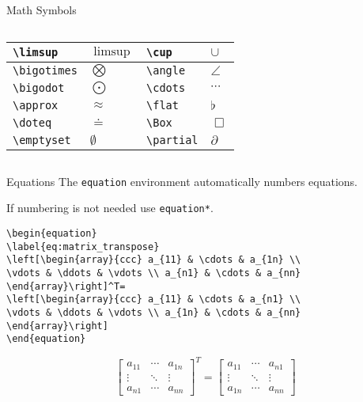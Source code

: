 \begin{frame}[fragile]{Math Symbols}
\begin{columns}
\begin{column}{5.5cm}
\begin{center}
\begin{tabular}{| l l | l l|}
\hline
\verb!\limsup! & $\limsup$ & \verb!\cup! & $\cup$
\\
\hline
\verb!\bigotimes! & $\bigotimes$ & \verb!\angle! & $\angle$
\\
\hline
\verb!\bigodot! & $\bigodot$ & \verb!\cdots! & $\cdots$
\\
\hline
\verb!\approx! & $\approx$ & \verb!\flat! & $\flat$
\\
\hline
\verb!\doteq! & $\doteq$ & \verb!\Box! & $\Box$
\\
\hline
\verb!\emptyset! & $\emptyset$ & \verb!\partial! & $\partial$
\\
\hline
\end{tabular}
\end{center}
\end{column}
\end{columns}
\end{frame}

\begin{frame}[fragile]{Equations}
The \texttt{equation} environment automatically numbers equations. 

If numbering is not needed use \texttt{equation*}.
\begin{lstlisting}
\begin{equation}
\label{eq:matrix_transpose}
\left[\begin{array}{ccc} a_{11} & \cdots & a_{1n} \\
\vdots & \ddots & \vdots \\ a_{n1} & \cdots & a_{nn}
\end{array}\right]^T= 
\left[\begin{array}{ccc} a_{11} & \cdots & a_{n1} \\
\vdots & \ddots & \vdots \\ a_{1n} & \cdots & a_{nn}
\end{array}\right]
\end{equation}
\end{lstlisting}

\begin{equation}
\label{eq:matrix_transpose}
\left[
\begin{array}{ccc}
a_{11} & \cdots & a_{1n} \\
\vdots & \ddots & \vdots \\
a_{n1} & \cdots & a_{nn}
\end{array}
\right]^T
= 
\left[
\begin{array}{ccc}
a_{11} & \cdots & a_{n1} \\
\vdots & \ddots & \vdots \\
a_{1n} & \cdots & a_{nn}
\end{array}
\right]
\end{equation}
\end{frame}

